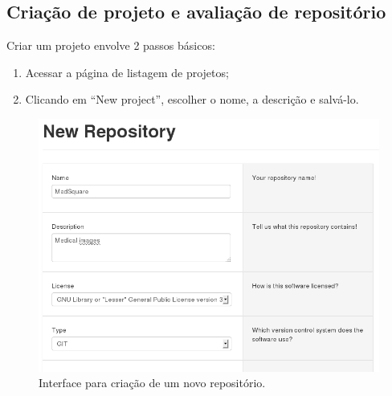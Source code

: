 \documentclass{llncs}
\begin{document}
  \subsection{Criação de projeto e avaliação de repositório}
  Criar um projeto envolve 2 passos básicos:
  \begin{enumerate}
    \item Acessar a página de listagem de projetos;
    \item Clicando em ``New project'', escolher o nome, a descrição e salvá-lo.
  \end{enumerate}

  \begin{figure}[H]
    \centering
    \includegraphics[width=\textwidth]{images/new-repository.png}
    \caption{Interface para criação de um novo repositório.}
    \label{fig:new-repository}
  \end{figure}
\end{document}
